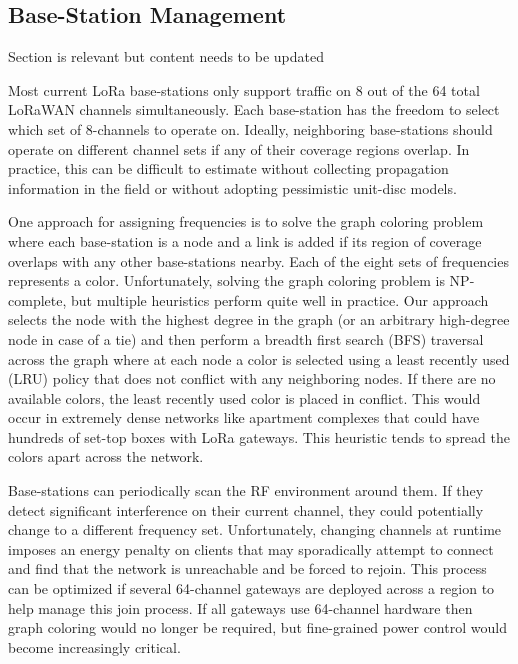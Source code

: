 

\subsection{Base-Station Management}\label{sec:bsm}

{\color{blue} Section is relevant but content needs to be updated}

Most current LoRa base-stations only support traffic on 8 out of the 64 total LoRaWAN channels simultaneously. Each base-station has the freedom to select which set of 8-channels to operate on.  Ideally, neighboring base-stations should operate on different channel sets if any of their coverage regions overlap.  In practice, this can be difficult to estimate without collecting propagation information in the field or without adopting pessimistic unit-disc models.   

One approach for assigning frequencies is to solve the graph coloring problem where each base-station is a node and a link is added if its region of coverage overlaps with any other base-stations nearby.  Each of the eight sets of frequencies represents a color.  Unfortunately, solving the graph coloring problem is NP-complete, but multiple heuristics perform quite well in practice.  Our approach selects the node with the highest degree in the graph (or an arbitrary high-degree node in case of a tie) and then perform a breadth first search (BFS) traversal across the graph where at each node a color is selected using a least recently used (LRU) policy that does not conflict with any neighboring nodes.  If there are no available colors, the least recently used color is placed in conflict. This would occur in extremely dense networks like apartment complexes that could have hundreds of set-top boxes with LoRa gateways.  This heuristic tends to spread the colors apart across the network. 

Base-stations can periodically scan the RF environment around them.  If they detect significant interference on their current channel, they could potentially change to a different frequency set.  Unfortunately, changing channels at runtime imposes an energy penalty on clients that may sporadically attempt to connect and find that the network is unreachable and be forced to rejoin.  This process can be optimized if several 64-channel gateways are deployed across a region to help manage this join process.  If all gateways use 64-channel hardware then graph coloring would no longer be required, but fine-grained power control would become increasingly critical.




